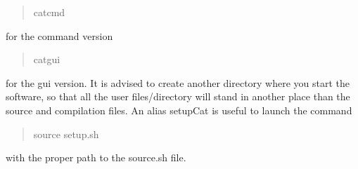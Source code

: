 \begin{quote}
catcmd \end{quote}
for the command version

\begin{quote}
catgui \end{quote}
for the gui version. It is advised to create another directory where you start the software, so that all the user files/directory will stand in another place than the source and compilation files. An alias setup\+Cat is useful to launch the command

\begin{quote}
source setup.\+sh \end{quote}
with the proper path to the source.\+sh file. 